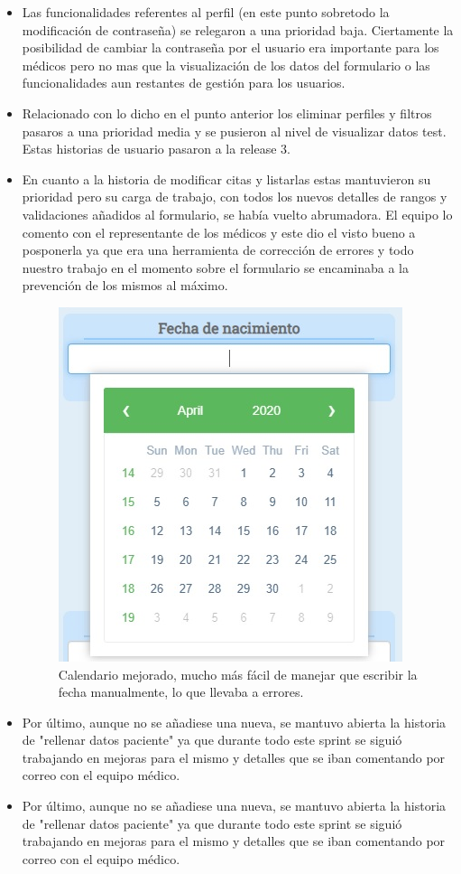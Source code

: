 \begin{itemize}
    \item Las funcionalidades referentes al perfil (en este punto sobretodo la modificación de contraseña) se relegaron a una prioridad baja. Ciertamente la posibilidad de cambiar la contraseña por el usuario era importante para los médicos pero no mas que la visualización de los datos del formulario o las funcionalidades aun restantes de gestión para los usuarios.\newline
    
    \item Relacionado con lo dicho en el punto anterior los eliminar perfiles y filtros pasaros a una prioridad media y se pusieron al nivel de visualizar datos test. Estas historias de usuario pasaron a la release 3.\newline
    
    \item En cuanto a la historia de modificar citas y listarlas estas mantuvieron su prioridad pero su carga de trabajo, con todos los nuevos detalles de rangos y validaciones añadidos al formulario, se había vuelto abrumadora. El equipo lo comento con el representante de los médicos y este dio el visto bueno a posponerla ya que era una herramienta de corrección de errores y todo nuestro trabajo en el momento sobre el formulario se encaminaba a la prevención de los mismos al máximo.\newline
    
    \begin{figure}[h]
    \centering
     \includegraphics[width=7.cm,height=7.cm]{images/calendario.jpg}
    \caption{Calendario mejorado, mucho más fácil de manejar que escribir la fecha manualmente, lo que llevaba a errores.}
    \end{figure}
    
      \item Por último, aunque no se añadiese una nueva, se mantuvo abierta la historia de "rellenar datos paciente" ya que durante todo este sprint se siguió trabajando en mejoras para el mismo y detalles que se iban comentando por correo con el equipo médico. \newline
    
    \item Por último, aunque no se añadiese una nueva, se mantuvo abierta la historia de "rellenar datos paciente" ya que durante todo este sprint se siguió trabajando en mejoras para el mismo y detalles que se iban comentando por correo con el equipo médico. \newline
\end{itemize}
